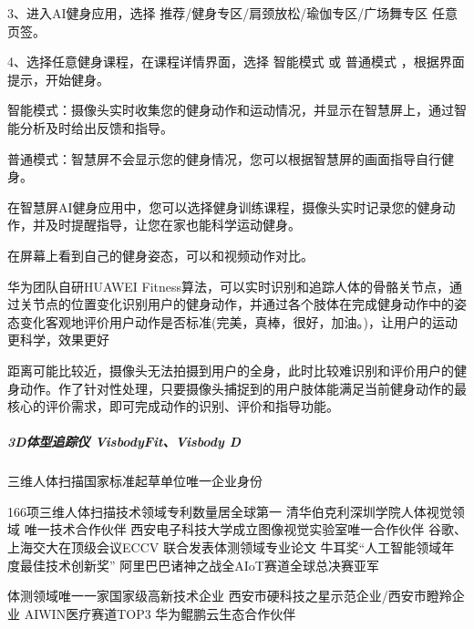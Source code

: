 \documentclass[letterpaper,11pt,english]{sphinxmanual}
\begin{document}
3、进入AI健身应用，选择 推荐/健身专区/肩颈放松/瑜伽专区/广场舞专区
任意页签。

4、选择任意健身课程，在课程详情界面，选择 智能模式 或 普通模式
，根据界面提示，开始健身。

智能模式：摄像头实时收集您的健身动作和运动情况，并显示在智慧屏上，通过智能分析及时给出反馈和指导。

普通模式：智慧屏不会显示您的健身情况，您可以根据智慧屏的画面指导自行健身。

在智慧屏AI健身应用中，您可以选择健身训练课程，摄像头实时记录您的健身动作，并及时提醒指导，让您在家也能科学运动健身。

在屏幕上看到自己的健身姿态，可以和视频动作对比。

华为团队自研HUAWEI
Fitness算法，可以实时识别和追踪人体的骨骼关节点，通过关节点的位置变化识别用户的健身动作，并通过各个肢体在完成健身动作中的姿态变化客观地评价用户动作是否标准(完美，真棒，很好，加油。)，让用户的运动更科学，效果更好

距离可能比较近，摄像头无法拍摄到用户的全身，此时比较难识别和评价用户的健身动作。作了针对性处理，只要摄像头捕捉到的用户肢体能满足当前健身动作的最核心的评价需求，即可完成动作的识别、评价和指导功能。


\subparagraph{3D体型追踪仪 VisbodyFit、Visbody D}
\label{\detokenize{chapter_project/AI_fit:d-visbodyfitvisbody-d}}
三维人体扫描国家标准起草单位唯一企业身份
%
\begin{footnote}[244]\sphinxAtStartFootnote
{}
%
\end{footnote}
166项三维人体扫描技术领域专利数量居全球第一
清华\sphinxhyphen{}伯克利深圳学院人体视觉领域 唯一技术合作伙伴
西安电子科技大学成立图像视觉实验室唯一合作伙伴
谷歌、上海交大在顶级会议ECCV 联合发表体测领域专业论文
牛耳奖“人工智能领域年度最佳技术创新奖”
阿里巴巴诸神之战全AIoT赛道全球总决赛亚军%
\begin{footnote}[245]\sphinxAtStartFootnote
{}
%
\end{footnote}
体测领域唯一一家国家级高新技术企业
西安市硬科技之星示范企业/西安市瞪羚企业 AIWIN医疗赛道TOP3
华为鲲鹏云生态合作伙伴
\end{document}
